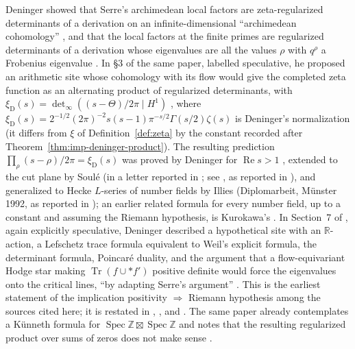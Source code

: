 \documentclass[11pt]{amsart}
\theoremstyle{plain}
\theoremstyle{definition}
\theoremstyle{remark}
\numberwithin{equation}{section}
\newcommand{\R}{\mathbb{R}}
\newcommand{\Z}{\mathbb{Z}}
\DeclareMathOperator{\Tr}{Tr}
\DeclareMathOperator{\Spec}{Spec}
\DeclareMathOperator{\Rea}{Re}
\newcommand{\detreg}{{\det}_{\infty}}
\renewcommand{\Re}{\Rea}
\begin{document}
Deninger showed that Serre's archimedean local factors are
zeta-regularized determinants of a derivation on an
infinite-dimensional ``archimedean cohomology''
\cite[Theorem~(4.1), p.~252]{Deninger1991Gamma}, and that the local
factors at the finite primes are regularized determinants of a
derivation whose eigenvalues are all the values $\rho$ with $q^\rho$ a
Frobenius eigenvalue
\cite[Proposition~(2.3), p.~142, and Theorem~(2.7), p.~144]%
{Deninger1992Local}. In \S3 of the same paper, labelled speculative, he
proposed an arithmetic site whose cohomology with its flow would give
the completed zeta function as an alternating product of regularized
determinants, with $\xi_{\mathrm D}(s)=\detreg((s-\Theta)/2\pi\mid
H^1)$ \cite[(3.1)--(3.2), pp.~146--147]{Deninger1992Local}, where
$\xi_{\mathrm D}(s)=2^{-1/2}(2\pi)^{-2}s(s-1)\pi^{-s/2}\Gamma(s/2)
\zeta(s)$ is Deninger's normalization (it differs from $\xi$ of
Definition~\ref{def:zeta} by the constant recorded after
Theorem~\ref{thm:imp-deninger-product}). The resulting prediction
$\prod_\rho(s-\rho)/2\pi=\xi_{\mathrm D}(s)$ was proved by Deninger for
$\Re s>1$ \cite[Theorem~3.3, p.~147]{Deninger1992Local}, extended to
the cut plane by Soul\'e (in a letter reported in
\cite[Remark~3.4(1), p.~147]{Deninger1992Local}; see
\cite{SchroeterSoule1994Deninger}, as reported in
\cite[p.~168]{Deninger1998Analogies}), and generalized to Hecke
$L$-series of number fields by Illies (Diplomarbeit, M\"unster 1992, as
reported in \cite[Theorem~7.18, p.~35]{Deninger1994Motivic}); an earlier
related formula for every number field, up to a constant and assuming
the Riemann hypothesis, is Kurokawa's
\cite[p.~24]{Kurokawa1988Parabolic}. In Section~7 of
\cite{Deninger1994Motivic}, again explicitly speculative, Deninger
described a hypothetical site with an $\R$-action, a Lefschetz trace
formula equivalent to Weil's explicit formula, the determinant formula,
Poincar\'e duality, and the argument that a flow-equivariant Hodge star
making $\Tr(f\cup*f')$ positive definite would force the eigenvalues
onto the critical lines, ``by adapting Serre's argument''
\cite[(7.2)--(7.13), pp.~29--33, and (7.19), p.~36]%
{Deninger1994Motivic}. This is the earliest statement of the
implication positivity $\Rightarrow$ Riemann hypothesis among the
sources cited here; it is restated in
\cite[pp.~168--169 and p.~172]{Deninger1998Analogies},
\cite[pp.~4--5]{Deninger2010HilbertPolya}, and
\cite[2.7, p.~3]{Deninger2022NoWeil}. The same paper already
contemplates a K\"unneth formula for $\Spec\Z\boxtimes\Spec\Z$ and
notes that the resulting regularized product over sums of zeros does
not make sense \cite[(7.32), pp.~41--42]{Deninger1994Motivic}.
\end{document}
